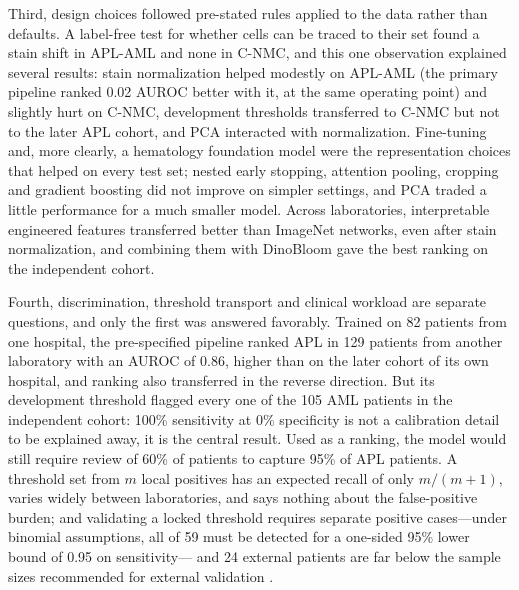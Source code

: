 \documentclass[journal]{IEEEtran}
\begin{document}
Third, design choices followed pre-stated rules applied to the data rather than defaults. A label-free test for whether cells can be traced to their set found a stain shift in APL-AML and none in C-NMC, and this one observation explained several results: stain normalization helped modestly on APL-AML (the primary pipeline ranked 0.02 AUROC better with it, at the same operating point) and slightly hurt on C-NMC, development thresholds transferred to C-NMC but not to the later APL cohort, and PCA interacted with normalization. Fine-tuning and, more clearly, a hematology foundation model were the representation choices that helped on every test set; nested early stopping, attention pooling, cropping and gradient boosting did not improve on simpler settings, and PCA traded a little performance for a much smaller model. Across laboratories, interpretable engineered features transferred better than ImageNet networks, even after stain normalization, and combining them with DinoBloom gave the best ranking on the independent cohort.

Fourth, discrimination, threshold transport and clinical workload are separate questions, and only the first was answered favorably. Trained on 82 patients from one hospital, the pre-specified pipeline ranked APL in 129 patients from another laboratory with an AUROC of 0.86, higher than on the later cohort of its own hospital, and ranking also transferred in the reverse direction. But its development threshold flagged every one of the 105 AML patients in the independent cohort: 100\% sensitivity at 0\% specificity is not a calibration detail to be explained away, it is the central result. Used as a ranking, the model would still require review of 60\% of patients to capture 95\% of APL patients. A threshold set from $m$ local positives has an expected recall of only $m/(m+1)$, varies widely between laboratories, and says nothing about the false-positive burden; and validating a locked threshold requires separate positive cases---under binomial assumptions, all of 59 must be detected for a one-sided 95\% lower bound of 0.95 on sensitivity--- and 24 external patients are far below the sample sizes recommended for external validation \cite{riley2021samplesize,collins2016samplesize}.
\end{document}
